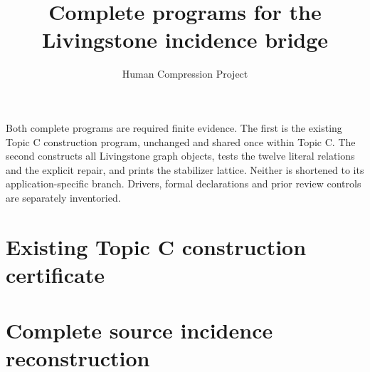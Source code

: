 
\title{Complete programs for the Livingstone incidence bridge}\author{Human Compression Project}\date{}
\maketitle
Both complete programs are required finite evidence. The first is the existing Topic C construction program, unchanged and shared once within Topic C. The second constructs all Livingstone graph objects, tests the twelve literal relations and the explicit repair, and prints the stabilizer lattice. Neither is shortened to its application-specific branch. Drivers, formal declarations and prior review controls are separately inventoried.
\section{Existing Topic C construction certificate}
\section{Complete source incidence reconstruction}

